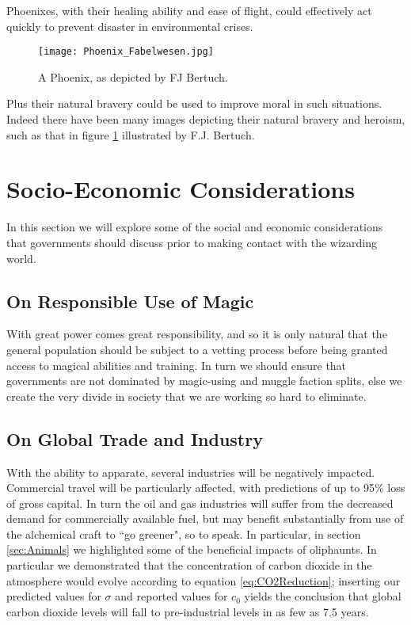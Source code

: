 \documentclass[]{article}
\begin{document}
Phoenixes, with their healing ability and ease of flight, could effectively act quickly to prevent disaster in environmental crises.
\begin{figure}[h]
    \centering
    \texttt{[image: Phoenix\_Fabelwesen.jpg]}
    \caption{A Phoenix, as depicted by FJ Bertuch. \label{fig:PhoenixFJBertuch}}
\end{figure}
Plus their natural bravery could be used to improve moral in such situations.
Indeed there have been many images depicting their natural bravery and heroism, such as that in figure \ref{fig:PhoenixFJBertuch} illustrated by F.J. Bertuch.

\section{Socio-Economic Considerations}
In this section we will explore some of the social and economic considerations that governments should discuss prior to making contact with the wizarding world.

\subsection*{On Responsible Use of Magic}
With great power comes great responsibility, and so it is only natural that the general population should be subject to a vetting process before being granted access to magical abilities and training.
In turn we should ensure that governments are not dominated by magic-using and muggle faction splits, else we create the very divide in society that we are working so hard to eliminate.

\subsection*{On Global Trade and Industry} 
With the ability to apparate, several industries will be negatively impacted.
Commercial travel will be particularly affected, with predictions of up to 95\% loss of gross capital.
In turn the oil and gas industries will suffer from the decreased demand for commercially available fuel, but may benefit substantially from use of the alchemical craft to ``go greener", so to speak.
In particular, in section \ref{sec:Animals} we highlighted some of the beneficial impacts of oliphaunts.
In particular we demonstrated that the concentration of carbon dioxide in the atmosphere would evolve according to equation \ref{eq:CO2Reduction}; inserting our predicted values for $\sigma$ and reported values for $c_{0}$ yields the conclusion that global carbon dioxide levels will fall to pre-industrial levels in as few as 7.5 years.
\end{document}
